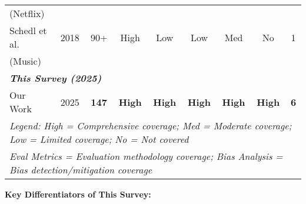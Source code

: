 \begin{table*}[ht]
\begin{tabular}{@{}lcccccccc@{}}
(Netflix) & & & & & & & & \\
Schedl et al. & 2018 & 90+ & High & Low & Low & Med & No & 1 \\
(Music) & & & & & & & & \\
\midrule
\multicolumn{9}{l}{\textbf{\textit{This Survey (2025)}}} \\
\midrule
Our Work & 2025 & \textbf{147} & \textbf{High} & \textbf{High} & \textbf{High} & \textbf{High} & \textbf{High} & \textbf{6} \\
\bottomrule
\multicolumn{9}{l}{\scriptsize \textit{Legend: High = Comprehensive coverage; Med = Moderate coverage; Low = Limited coverage; No = Not covered}} \\
\multicolumn{9}{l}{\scriptsize \textit{Eval Metrics = Evaluation methodology coverage; Bias Analysis = Bias detection/mitigation coverage}} \\
\end{tabular}
\end{table*}

\textbf{Key Differentiators of This Survey:}

